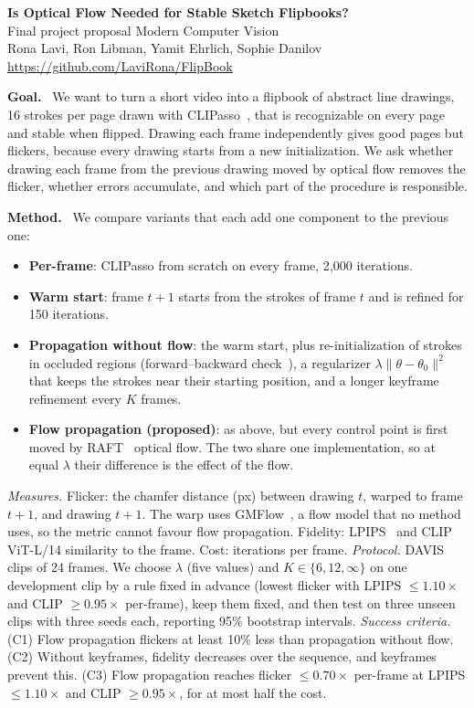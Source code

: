 \documentclass[10pt]{article}
\newcommand{\head}[1]{\textbf{\color[HTML]{1f4e8c}#1.}~}
\begin{document}
\begin{center}
{\large\bfseries Is Optical Flow Needed for Stable Sketch Flipbooks?}\\[2pt]
Final project proposal \textbullet{} Modern Computer Vision\\
Rona Lavi, Ron Libman, Yamit Ehrlich, Sophie Danilov \textbullet{} \url{https://github.com/LaviRona/FlipBook}
\end{center}

\head{Goal} We want to turn a short video into a flipbook of abstract line drawings, 16 strokes per page drawn with
CLIPasso~\citep{vinker2022clipasso}, that is recognizable on every page and stable when flipped. Drawing each frame
independently gives good pages but flickers, because every drawing starts from a new initialization. We ask whether drawing
each frame from the previous drawing moved by optical flow removes the flicker, whether errors accumulate, and which
part of the procedure is responsible.

\head{Method} We compare variants that each add one component to the previous one:
\begin{itemize}
\item \textbf{Per-frame}: CLIPasso from scratch on every frame, 2{,}000 iterations.
\item \textbf{Warm start}: frame $t{+}1$ starts from the strokes of frame $t$ and is refined for 150 iterations.
\item \textbf{Propagation without flow}: the warm start, plus re-initialization of strokes in occluded regions
  (forward--backward check~\citep{sundaram2010dense}), a regularizer $\lambda\lVert\theta-\theta_0\rVert^2$ that keeps
  the strokes near their starting position, and a longer keyframe refinement every $K$ frames.
\item \textbf{Flow propagation (proposed)}: as above, but every control point is first moved by RAFT~\citep{teed2020raft}
  optical flow. The two share one implementation, so at equal $\lambda$ their difference is the effect of the flow.
\end{itemize}
\emph{Measures.} Flicker: the chamfer distance (px) between drawing $t$, warped to frame $t{+}1$, and drawing $t{+}1$.
The warp uses GMFlow~\citep{xu2022gmflow,xu2023unifying}, a flow model that no method uses, so the metric cannot favour flow
propagation. Fidelity: LPIPS~\citep{zhang2018lpips} and CLIP ViT-L/14 similarity to the frame. Cost: iterations per
frame.
\emph{Protocol.} DAVIS~\citep{pont2017davis} clips of 24 frames. We choose $\lambda$ (five values) and
$K\in\{6,12,\infty\}$ on one development clip by a rule fixed in advance (lowest flicker with LPIPS $\le1.10\times$
and CLIP $\ge0.95\times$ per-frame), keep them fixed, and then test on three unseen clips with
three seeds each, reporting 95\% bootstrap intervals.
\emph{Success criteria.} (C1) Flow propagation flickers at least 10\% less than propagation without flow. (C2) Without
keyframes, fidelity decreases over the sequence, and keyframes prevent this. (C3) Flow
propagation reaches flicker $\le0.70\times$ per-frame at LPIPS $\le1.10\times$ and CLIP $\ge0.95\times$, for at most
half the cost.
\end{document}
